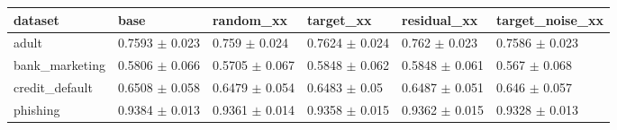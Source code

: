 \begin{tabular}{llllll}
\toprule
dataset & base & random\_xx & target\_xx & residual\_xx & target\_noise\_xx \\
\midrule
adult & 0.7593 $\pm$ 0.023 & 0.759 $\pm$ 0.024 & 0.7624 $\pm$ 0.024 & 0.762 $\pm$ 0.023 & 0.7586 $\pm$ 0.023 \\
bank\_marketing & 0.5806 $\pm$ 0.066 & 0.5705 $\pm$ 0.067 & 0.5848 $\pm$ 0.062 & 0.5848 $\pm$ 0.061 & 0.567 $\pm$ 0.068 \\
credit\_default & 0.6508 $\pm$ 0.058 & 0.6479 $\pm$ 0.054 & 0.6483 $\pm$ 0.05 & 0.6487 $\pm$ 0.051 & 0.646 $\pm$ 0.057 \\
phishing & 0.9384 $\pm$ 0.013 & 0.9361 $\pm$ 0.014 & 0.9358 $\pm$ 0.015 & 0.9362 $\pm$ 0.015 & 0.9328 $\pm$ 0.013 \\
\bottomrule
\end{tabular}
